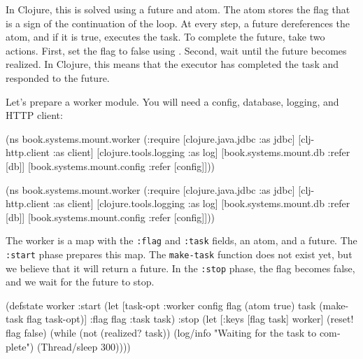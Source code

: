
In Clojure, this is solved using a future and atom. The atom stores the flag that is a sign of the continuation of the loop. At every step, a future dereferences the atom, and if it is true, executes the task. To complete the future, take two actions. First, set the flag to false using . Second, wait until the future becomes realized. In Clojure, this means that the executor has completed the task and responded to the future.

Let's prepare a worker module. You will need a config, database, logging, and HTTP client:

\ifnarrow

\begin{english}
  \begin{clojure}
(ns book.systems.mount.worker
  (:require
   [clojure.java.jdbc :as jdbc]
   [clj-http.client :as client]
   [clojure.tools.logging :as log]
   [book.systems.mount.db :refer [db]]
   [book.systems.mount.config
    :refer [config]]))
  \end{clojure}
\end{english}

\else

\begin{english}
  \begin{clojure}
(ns book.systems.mount.worker
  (:require
   [clojure.java.jdbc :as jdbc]
   [clj-http.client :as client]
   [clojure.tools.logging :as log]
   [book.systems.mount.db :refer [db]]
   [book.systems.mount.config :refer [config]]))
  \end{clojure}
\end{english}

\fi

The worker is a map with the \verb|:flag| and \verb|:task| fields, an atom, and a future. The \verb|:start| phase prepares this map. The \verb|make-task| function does not exist yet, but we believe that it will return a future. In the \verb|:stop| phase, the flag becomes false, and we wait for the future to stop.


\ifnarrow

\begin{english}
  \begin{clojure}
(defstate worker
  :start
  (let [{task-opt :worker} config
        flag (atom true)
        task (make-task flag task-opt)]
    {:flag flag :task task})
  :stop
  (let [{:keys [flag task]} worker]
    (reset! flag false)
    (while (not (realized? task))
      (log/info
      "Waiting for the task
                to complete")
      (Thread/sleep 300))))
  \end{clojure}
\end{english}

